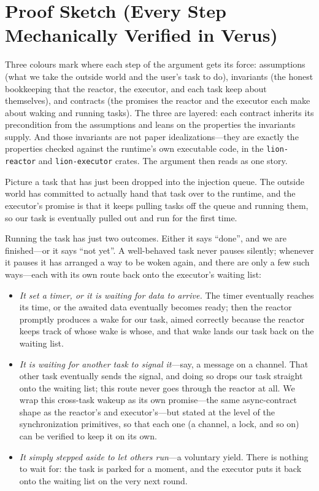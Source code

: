 \documentclass[11pt]{article}
\newcommand{\asm}[1]{\textcolor{cAssume}{#1}}
\newcommand{\inv}[1]{\textcolor{cInv}{#1}}
\newcommand{\ctr}[1]{\textcolor{cContract}{#1}}
\theoremstyle{plain}
\theoremstyle{definition}
\begin{document}
\section{Proof Sketch (Every Step Mechanically Verified in Verus)}
\label{sec:sketch}

Three colours mark where each step of the argument gets its force:
\asm{assumptions} (what we take the outside world and the user's task to do),
\inv{invariants} (the honest bookkeeping that the reactor, the executor, and each task keep
about themselves), and \ctr{contracts} (the promises the reactor and the executor each make
about waking and running tasks). The three are layered: each \ctr{contract} inherits its
precondition from the \asm{assumptions} and leans on the properties the \inv{invariants}
supply. And those \inv{invariants} are not paper idealizations---they are exactly the
properties checked against the runtime's own executable code, in the \texttt{lion-reactor}
and \texttt{lion-executor} crates. The argument then reads as one story.

Picture a task that has just been dropped into the injection queue. \asm{The outside world
has committed to actually hand that task over to the runtime}, and \ctr{the executor's
promise is that it keeps pulling tasks off the queue and running them}, so our task is
eventually pulled out and run for the first time.

Running the task has just two outcomes. Either it says ``done'', and we are finished---or it
says ``not yet''. \inv{A well-behaved task never pauses silently; whenever it pauses it has
arranged a way to be woken again}, and there are only a few such ways---each with its own
route back onto the executor's waiting list:

\begin{itemize}
  \item \emph{It set a timer, or it is waiting for data to arrive.} \asm{The timer
    eventually reaches its time, or the awaited data eventually becomes ready}; then
    \ctr{the reactor promptly produces a wake for our task}, \inv{aimed correctly because
    the reactor keeps track of whose wake is whose}, and that wake lands our task back on
    the waiting list.
  \item \emph{It is waiting for another task to signal it}---say, a message on a channel.
    \asm{That other task eventually sends the signal}, and doing so drops our task straight
    onto the waiting list; this route never goes through the reactor at all. \ctr{We wrap
    this cross-task wakeup as its own promise---the same async-contract shape as the
    reactor's and executor's---but stated at the level of the synchronization primitives, so
    that each one (a channel, a lock, and so on) can be verified to keep it on its own.}
  \item \emph{It simply stepped aside to let others run}---a voluntary yield. There is
    nothing to wait for: the task is parked for a moment, and \ctr{the executor puts it back
    onto the waiting list on the very next round}.
\end{itemize}
\end{document}
